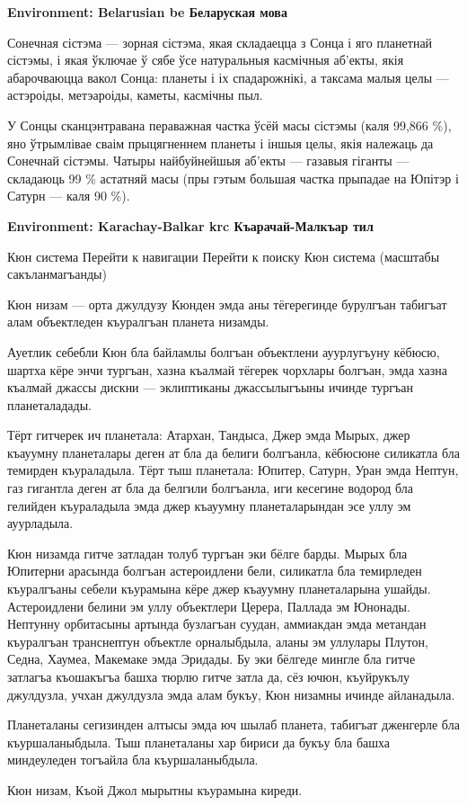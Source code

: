 \documentclass{article}
\begin{document}
\bigskip
{\forig \bfseries Environment: Belarusian be Беларуская мова}\par
\begin{cyrtranse}
Сонечная сістэма — зорная сістэма, якая складаецца з Сонца і яго планетнай сістэмы, і якая ўключае ў сябе ўсе натуральныя касмічныя аб'екты, якія абарочваюцца вакол Сонца: планеты і іх спадарожнікі, а таксама малыя целы — астэроіды, метэароіды, каметы, касмічны пыл.

У Сонцы сканцэнтравана пераважная частка ўсёй масы сістэмы (каля 99,866 \%), яно ўтрымлівае сваім прыцягненнем планеты і іншыя целы, якія належаць да Сонечнай сістэмы. Чатыры найбуйнейшыя аб'екты — газавыя гіганты — складаюць 99 \% астатняй масы (пры гэтым большая частка прыпадае на Юпітэр і Сатурн — каля 90 \%). 
\end{cyrtranse}

\bigskip
{\forig \bfseries Environment: Karachay-Balkar krc Къарачай-Малкъар тил}\par
\begin{cyrtranse}
Кюн система
Перейти к навигации
Перейти к поиску
Кюн система (масштабы сакъланмагъанды)

Кюн низам — орта джулдузу Кюнден эмда аны тёгерегинде бурулгъан табигъат алам объектледен къуралгъан планета низамды.

Ауетлик себебли Кюн бла байламлы болгъан объектлени ауурлугъуну кёбюсю, шартха кёре энчи тургъан, хазна къалмай тёгерек чорхлары болгъан, эмда хазна къалмай джассы дискни — эклиптиканы джассылыгъыны ичинде тургъан планеталадады.

Тёрт гитчерек ич планетала: Атархан, Тандыса, Джер эмда Мырых, джер къауумну планеталары деген ат бла да белиги болгъанла, кёбюсюне силикатла бла темирден къураладыла. Тёрт тыш планетала: Юпитер, Сатурн, Уран эмда Нептун, газ гигантла деген ат бла да белгили болгъанла, иги кесегине водород бла гелийден къураладыла эмда джер къауумну планеталарындан эсе уллу эм ауурладыла.

Кюн низамда гитче затладан толуб тургъан эки бёлге барды. Мырых бла Юпитерни арасында болгъан астероидлени бели, силикатла бла темирледен къуралгъаны себели къурамына кёре джер къауумну планеталарына ушайды. Астероидлени белини эм уллу объектлери Церера, Паллада эм Юнонады. Нептунну орбитасыны артында бузлагъан суудан, аммиакдан эмда метандан къуралгъан транснептун объектле орналыбдыла, аланы эм уллулары Плутон, Седна, Хаумеа, Макемаке эмда Эридады. Бу эки бёлгеде мингле бла гитче затлагъа къошакъгъа башха тюрлю гитче затла да, сёз ючюн, къуйрукълу джулдузла, учхан джулдузла эмда алам букъу, Кюн низамны ичинде айланадыла.

Планеталаны сегизинден алтысы эмда юч шылаб планета, табигъат дженгерле бла къуршаланыбдыла. Тыш планеталаны хар бириси да букъу бла башха миндеуледен тогъайла бла къуршаланыбдыла.

Кюн низам, Къой Джол мырытны къурамына киреди. 
\end{cyrtranse}
\end{document}
